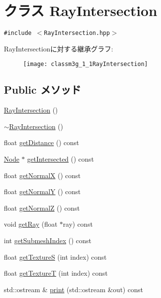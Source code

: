 \hypertarget{classm3g_1_1RayIntersection}{
\section{クラス RayIntersection}
\label{classm3g_1_1RayIntersection}
}
{\tt \#include $<$RayIntersection.hpp$>$}

RayIntersectionに対する継承グラフ:\begin{figure}[H]
\begin{center}
\leavevmode
\texttt{[image: classm3g\_1\_1RayIntersection]}
\end{center}
\end{figure}
\subsection*{Public メソッド}
\begin{CompactItemize}
\item 
\hyperlink{classm3g_1_1RayIntersection_242b33a79f98ed90ad5a36912d2a46d5}{RayIntersection} ()
\item 
\hyperlink{classm3g_1_1RayIntersection_bf9eb45cc9ff31acd542bb0da1b46fe1}{$\sim$RayIntersection} ()
\item 
float \hyperlink{classm3g_1_1RayIntersection_f024301f51d2ef67cac50e3255a49612}{getDistance} () const 
\item 
\hyperlink{classm3g_1_1Node}{Node} $\ast$ \hyperlink{classm3g_1_1RayIntersection_cbf90cea6001c33cc03b5a737b312f62}{getIntersected} () const 
\item 
float \hyperlink{classm3g_1_1RayIntersection_0ee7a8fab5e001b131bd3109da8af7fa}{getNormalX} () const 
\item 
float \hyperlink{classm3g_1_1RayIntersection_1e05e3b3e8d6b46462812e4713a63d18}{getNormalY} () const 
\item 
float \hyperlink{classm3g_1_1RayIntersection_5d0569741397401f53b776f16d08f5c3}{getNormalZ} () const 
\item 
void \hyperlink{classm3g_1_1RayIntersection_3f4d1f2f24c0dadab914014836e1b138}{getRay} (float $\ast$ray) const 
\item 
int \hyperlink{classm3g_1_1RayIntersection_6a11c61d1a1fecc01f2f83463404a6b8}{getSubmeshIndex} () const 
\item 
float \hyperlink{classm3g_1_1RayIntersection_bc14e1d5a83d5fca608b1fbf772614d4}{getTextureS} (int index) const 
\item 
float \hyperlink{classm3g_1_1RayIntersection_843d5b907bb54a6f28571f0a0f14c932}{getTextureT} (int index) const 
\item 
std::ostream \& \hyperlink{classm3g_1_1RayIntersection_6fea17fa1532df3794f8cb39cb4f911f}{print} (std::ostream \&out) const 
\end{CompactItemize}


